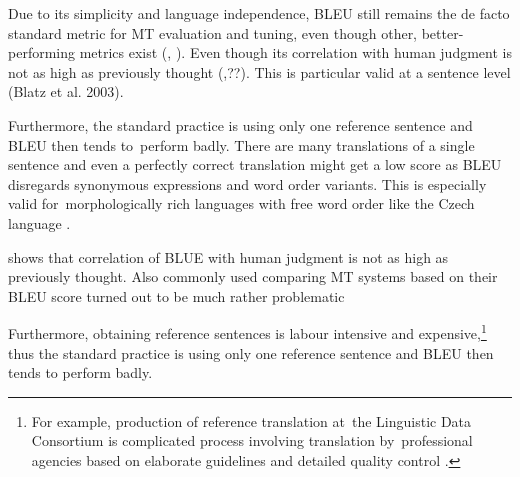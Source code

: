 



Due to its simplicity and language independence, BLEU still remains the de facto standard metric for MT evaluation and tuning, even though other, better-performing metrics exist (\cite{wmt13-metrics}, \cite{wmt14}).
Even though its correlation with human judgment is not as high as previously thought (\cite{callison2006re},\cite{koehn-monz:2006:WMT}??). 
This is particular valid at a sentence level (Blatz et al. 2003).

Furthermore, the standard practice is using only one reference sentence and BLEU  then tends to~perform badly. 
There are many translations of a single sentence and even a perfectly correct translation might get a low score as BLEU disregards synonymous expressions and word order variants.
This is especially valid for~morphologically rich languages with free word order like the Czech language \cite{bojar-tackling-sparse-data}.



\cite{callison2006re} shows that correlation of BLUE with human judgment is not as high as previously thought. 
Also commonly used comparing MT systems based on their BLEU score turned out to be much rather problematic \cite{post-2018-call}

Furthermore, obtaining reference sentences is labour intensive and expensive,\footnote{For example, production of reference translation at~the Linguistic Data Consortium is complicated process involving translation by~professional agencies based on elaborate guidelines and detailed quality control \cite{strassel}.} thus the standard practice is using only one reference sentence and BLEU then tends to perform badly. 

